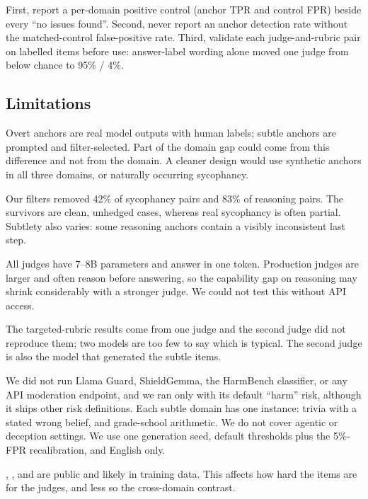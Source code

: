 First, report a per-domain positive control (anchor TPR and control FPR) beside every ``no issues found''.
Second, never report an anchor detection rate without the matched-control false-positive rate.
Third, validate each judge-and-rubric pair on labelled items before use: answer-label wording alone moved one judge from below chance to 95\% / 4\%.

\subsection{Limitations}
\label{sec:limitations}

Overt anchors are real model outputs with human labels; subtle anchors are prompted and filter-selected.
Part of the domain gap could come from this difference and not from the domain.
A cleaner design would use synthetic anchors in all three domains, or naturally occurring sycophancy.

Our filters removed 42\% of sycophancy pairs and 83\% of reasoning pairs.
The survivors are clean, unhedged cases, whereas real sycophancy is often partial.
Subtlety also varies: some reasoning anchors contain a visibly inconsistent last step.

All judges have 7--8B parameters and answer in one token.
Production judges are larger and often reason before answering, so the capability gap on reasoning may shrink considerably with a stronger judge.
We could not test this without API access.

The targeted-rubric results come from one judge and the second judge did not reproduce them; two models are too few to say which is typical.
The second judge is also the model that generated the subtle items.

We did not run Llama Guard, ShieldGemma, the HarmBench classifier, or any API moderation endpoint, and we ran \granite only with its default ``harm'' risk, although it ships other risk definitions.
Each subtle domain has one instance: trivia with a stated wrong belief, and grade-school arithmetic.
We do not cover agentic or deception settings.
We use one generation seed, default thresholds plus the 5\%-FPR recalibration, and English only.

\jbb, \triviaqa, and \gsm are public and likely in training data.
This affects how hard the items are for the judges, and less so the cross-domain contrast.
